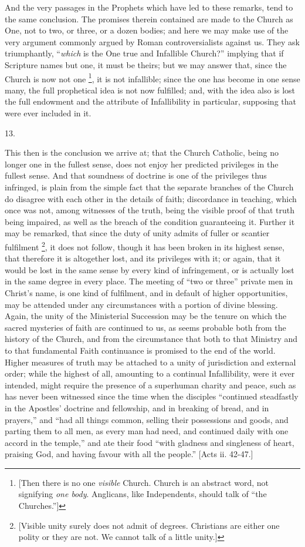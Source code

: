 And the very passages in the Prophets which have led to these
remarks, tend to the same conclusion. The promises therein contained
are made to the Church as One, not to two, or three, or a dozen
bodies; and here we may make use of the very argument commonly argued
by Roman controversialists against us. They ask triumphantly, ``\emph{which}
is the One true and Infallible Church?'' implying that if
Scripture names but one, it must be theirs; but we may answer that,
since the Church is now not one \footnote{[Then there is no one \emph{visible} Church.
Church is an abstract word, not signifying \emph{one body}. Anglicans,
like Independents, should talk of ``the Churches.'']}, it is not infallible; since the one has become in one sense
many, the full prophetical idea is not now fulfilled; and, with the
idea also is lost the full endowment and the attribute of
Infallibility in particular, supposing that were ever included in it.

13.

This then is the conclusion we arrive at; that the Church Catholic,
being no longer one in the fullest sense, does not enjoy her predicted
privileges in the fullest sense. And that soundness of doctrine is one
of the privileges thus infringed, is plain from the simple fact that
the separate branches of the Church do disagree with each other
in the details of faith; discordance in teaching, which once was not,
among witnesses of the truth, being the visible proof of that truth
being impaired, as well as the breach of the condition guaranteeing
it. Further it may be remarked, that since the duty of unity admits of
fuller or scantier fulfilment \footnote{[Visible unity surely does not admit of
degrees. Christians are either one polity or they are not. We cannot
talk of a little unity.]},
it does not follow, though it has been broken in its highest sense,
that therefore it is altogether lost, and its privileges with it; or
again, that it would be lost in the same sense by every kind of
infringement, or is actually lost in the same degree in every place.
The meeting of ``two or three'' private men in Christ's name,
is one kind of fulfilment, and in default of higher opportunities, may
be attended under any circumstances with a portion of divine blessing.
Again, the unity of the Ministerial Succession may be the tenure on
which the sacred mysteries of faith are continued to us, as seems
probable both from the history of the Church, and from the
circumstance that both to that Ministry and to that fundamental Faith
continuance is promised to the end of the world. Higher measures of
truth may be attached to a unity of jurisdiction and external order;
while the highest of all, amounting to a continual Infallibility, were
it ever intended, might require the presence of a superhuman charity
and peace, such as has never been witnessed since the time when the
disciples ``continued steadfastly in the Apostles' doctrine and
fellowship, and in breaking of bread, and in prayers,'' and
``had all things common, selling their possessions and goods, and
parting them to all men, as every man had need, and continued daily
with one accord in the temple,'' and ate their food ``with
gladness and singleness of heart, praising God, and having favour with
all the people.'' [Acts ii. 42-47.]

